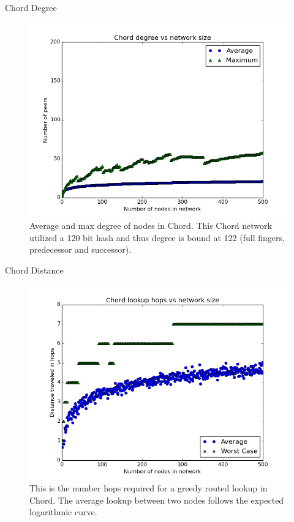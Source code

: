 \documentclass[11pt]{beamer}
\begin{document}

\begin{frame}{Chord Degree}
\begin{figure}
	\centering
	\includegraphics[width=0.65\linewidth]{figs/ChordDegree}
	\caption[Degree of nodes in Chord]{Average and max degree of nodes in Chord. This Chord network utilized a 120 bit hash and thus degree is bound at 122 (full fingers, predecessor and successor).}
	\label{fig:ChordDegree}
\end{figure}

\end{frame}



\begin{frame}{Chord Distance}
\begin{figure}
	\centering
	\includegraphics[width=0.7\linewidth]{figs/ChordDistance}
	\caption[Chord hops]{This is the number hops required for a greedy routed lookup in Chord. The average lookup between two nodes follows the expected logarithmic curve.}
	\label{fig:ChordDistance}
\end{figure}
\end{frame}
\end{document}
